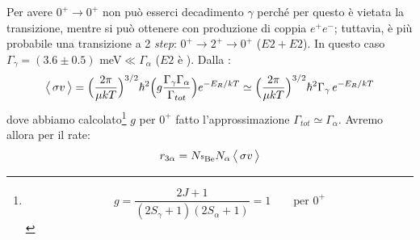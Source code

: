 \noindent Per avere $0^+\to0^+$ non può esserci decadimento $\gamma$ perché per questo è vietata la transizione, mentre si può ottenere con produzione di coppia $e^+e^-$; tuttavia, è più probabile una transizione a 2 \textit{step}: $0^+\to2^+\to0^+$ ($E2+E2$). In questo caso $\Gamma_\gamma = (3.6\pm 0.5)$ meV$\ll \Gamma_\alpha$ ($E2$ è ). Dalla \BW{}:
$$\bigl\langle\, \sigma v\, \bigr\rangle = \Bigl ( \frac{2\pi}{\mu kT} \Bigr )^{3/2} \hbar^2 \Bigl ( g \frac{\Gamma_\gamma\Gamma_\alpha}{\Gamma_{tot}} \Bigr ) e^{-E_R/kT}\simeq \Bigl ( \frac{2\pi}{\mu kT} \Bigr )^{3/2} \hbar^2 \Gamma_\gamma\, e^{-E_R/kT}$$
dove abbiamo calcolato\footnote{$$g=\frac{2J+1}{(2S_\gamma + 1)(2S_\alpha +1)} = 1 \qquad \text{per } 0^+$$} $g$ per $0^+$ fatto l'approssimazione $\Gamma_{tot} \simeq \Gamma_\alpha$. Avremo allora per il rate:
$$r_{3\alpha} = N_{\ce{^8Be}}N_\alpha \, \mean{\sigma v}$$



